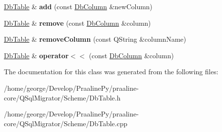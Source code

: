 \begin{DoxyCompactItemize}
\item 
\mbox{\label{class_q_sql_migrator_1_1_scheme_1_1_db_table_a4e0f343af05de48a8334ae9fa436f62d}} 
\hyperlink{class_q_sql_migrator_1_1_scheme_1_1_db_table}{Db\+Table} \& {\bfseries add} (const \hyperlink{class_q_sql_migrator_1_1_scheme_1_1_db_column}{Db\+Column} \&new\+Column)
\item 
\mbox{\label{class_q_sql_migrator_1_1_scheme_1_1_db_table_abdd2b60f6322c845f2d735c3fb8e7f7e}} 
\hyperlink{class_q_sql_migrator_1_1_scheme_1_1_db_table}{Db\+Table} \& {\bfseries remove} (const \hyperlink{class_q_sql_migrator_1_1_scheme_1_1_db_column}{Db\+Column} \&column)
\item 
\mbox{\label{class_q_sql_migrator_1_1_scheme_1_1_db_table_ac2bf38e55c8b54c7c2a88c00d7d9e2b8}} 
\hyperlink{class_q_sql_migrator_1_1_scheme_1_1_db_table}{Db\+Table} \& {\bfseries remove\+Column} (const Q\+String \&column\+Name)
\item 
\mbox{\label{class_q_sql_migrator_1_1_scheme_1_1_db_table_aade4f3354cbb7ade844892c24f666b0d}} 
\hyperlink{class_q_sql_migrator_1_1_scheme_1_1_db_table}{Db\+Table} \& {\bfseries operator$<$$<$} (const \hyperlink{class_q_sql_migrator_1_1_scheme_1_1_db_column}{Db\+Column} \&column)
\end{DoxyCompactItemize}


The documentation for this class was generated from the following files\+:\begin{DoxyCompactItemize}
\item 
/home/george/\+Develop/\+Praaline\+Py/praaline-\/core/\+Q\+Sql\+Migrator/\+Scheme/Db\+Table.\+h\item 
/home/george/\+Develop/\+Praaline\+Py/praaline-\/core/\+Q\+Sql\+Migrator/\+Scheme/Db\+Table.\+cpp\end{DoxyCompactItemize}
